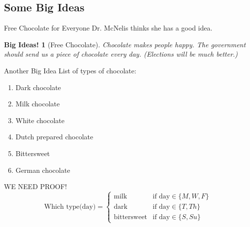 \documentclass{beamer} %
\newtheorem{idea}{Big Ideas!}
\begin{document}
\subsection{Some Big Ideas}

\begin{frame}{Free Chocolate for Everyone}
    Dr. McNelis thinks she has a good idea.
    \begin{idea}[Free Chocolate]
    Chocolate makes people happy. The government should send us a piece of chocolate every day. (Elections will be much better.)
    \end{idea}
\end{frame}

\begin{frame}{Another Big Idea}
    List of types of chocolate:
    \begin{enumerate} %
        \item<1-> Dark chocolate 
        \item<2-3> Milk chocolate
        \item<3-5> White chocolate
        \item<2-> Dutch prepared chocolate
        \item<4-> Bittersweet
        \item<5-> German chocolate
    \end{enumerate}
\end{frame}

\begin{frame}{WE NEED PROOF!}
\[ \text{Which type(day)} = \left\{ %
\begin{array}{ll}
     \text{milk} & \text{if day} \in \{M,W,F\} \\
     \text{dark} & \text{if day} \in \{T, Th\} \\
     \text{bittersweet} & \text{if day} \in \{S, Su\}
\end{array}
\right. \]
\end{frame}
\end{document}
